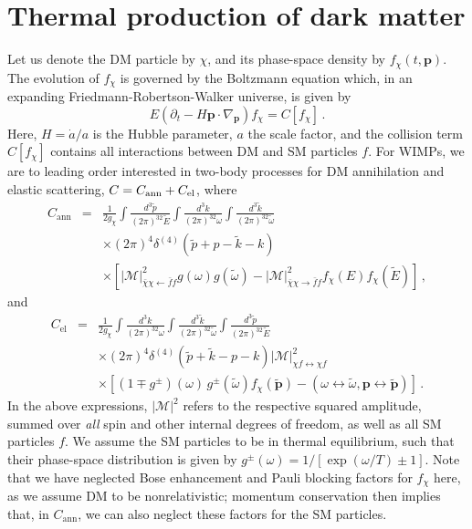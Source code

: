 \documentclass[twocolumn,showpacs,amsmath,amssymb,superscriptaddress,nofootinbib]{revtex4-1}
\newcommand{\be}{\begin{equation}}
\newcommand{\ee}{\end{equation}}
\newcommand{\bea}{\begin{eqnarray}}
\newcommand{\eea}{\end{eqnarray}}
\begin{document}
\section{Thermal production of dark matter}
\label{sec:BEgeneral}

Let us denote the DM particle by $\chi$, and its phase-space density by
$f_\chi(t,\mathbf{p})$. The evolution of $f_\chi$ is governed by the Boltzmann
equation which, in an expanding Friedmann-Robertson-Walker universe,
is given by \cite{Kolb:1990vq,Bringmann:2006mu}
\be
  \label{diff_boltzmann}
  E\left(\partial_t-H\mathbf{p}\cdot\nabla_\mathbf{p}\right)f_\chi=C[f_\chi]\,.
\ee
Here, $H=\dot a/a$ is the Hubble parameter, $a$ the scale factor, and the collision term $C[f_\chi]$
contains all interactions between DM and SM particles $f$. For
WIMPs, we are to leading order interested in two-body processes for
DM annihilation and elastic scattering, $C=C_{\rm ann}+C_{\rm el}$, where
\bea
  \label{Candd_def}
  C_\mathrm{ann}&=&\frac{1}{2g_\chi}\int\frac{d^3\tilde p}{(2\pi)^32\tilde E}\int\frac{d^3k}{(2\pi)^32\omega}\int\frac{d^3\tilde k}{(2\pi)^32\tilde \omega}\\
&&\times(2\pi)^4\delta^{(4)}(\tilde p+p-\tilde k-k)\nonumber\\
&&\times\left[
\left|\mathcal{M}\right|^2_{\bar\chi\chi\leftarrow \bar f f}g(\omega)g(\tilde \omega)
-\left|\mathcal{M}\right|^2_{\bar\chi\chi\rightarrow \bar f f}f_\chi(E)f_\chi(\tilde E)
\right]\,,\nonumber
\eea
and
\bea
  \label{Celd_ef}
  C_\mathrm{el}&=&\frac{1}{2g_\chi}\int\frac{d^3k}{(2\pi)^32\omega}\int\frac{d^3\tilde k}{(2\pi)^32\tilde \omega}\int\frac{d^3\tilde p}{(2\pi)^32\tilde E}\\
  &&\times(2\pi)^4\delta^{(4)}(\tilde p+\tilde k-p-k) {\left|\mathcal{M}\right|}^2_{\chi f\leftrightarrow\chi f}\nonumber\\
  &&\times\left[(1\mp g^\pm)(\omega)\, g^\pm(\tilde\omega)f_\chi(\mathbf{\tilde p})-
  (\omega\leftrightarrow\tilde\omega, \mathbf{p}\leftrightarrow\mathbf{\tilde p})\right]\,.\nonumber
\eea
In the above expressions, ${\left|\mathcal{M}\right|}^2$ refers to the respective squared %
amplitude, summed
over {\it all}  spin and other internal degrees of freedom, as well as all SM particles $f$. We assume the SM
particles to be in thermal equilibrium, %
such that their phase-space distribution is given
by $g^\pm(\omega)=1/\left[\exp(\omega/T)\pm1 \right]$. Note that we have neglected Bose enhancement 
and Pauli blocking factors for $f_\chi$ here, as we assume  DM to be nonrelativistic; momentum 
conservation then implies that,  in $C_\mathrm{ann}$, we can also neglect these factors for the SM particles.
\end{document}
